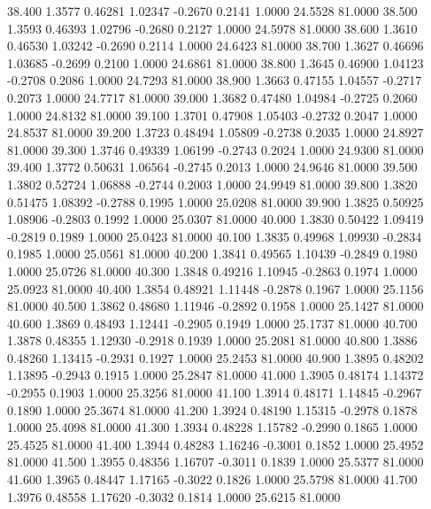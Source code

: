   38.400   1.3577   0.46281   1.02347  -0.2670   0.2141   1.0000  24.5528  81.0000
  38.500   1.3593   0.46393   1.02796  -0.2680   0.2127   1.0000  24.5978  81.0000
  38.600   1.3610   0.46530   1.03242  -0.2690   0.2114   1.0000  24.6423  81.0000
  38.700   1.3627   0.46696   1.03685  -0.2699   0.2100   1.0000  24.6861  81.0000
  38.800   1.3645   0.46900   1.04123  -0.2708   0.2086   1.0000  24.7293  81.0000
  38.900   1.3663   0.47155   1.04557  -0.2717   0.2073   1.0000  24.7717  81.0000
  39.000   1.3682   0.47480   1.04984  -0.2725   0.2060   1.0000  24.8132  81.0000
  39.100   1.3701   0.47908   1.05403  -0.2732   0.2047   1.0000  24.8537  81.0000
  39.200   1.3723   0.48494   1.05809  -0.2738   0.2035   1.0000  24.8927  81.0000
  39.300   1.3746   0.49339   1.06199  -0.2743   0.2024   1.0000  24.9300  81.0000
  39.400   1.3772   0.50631   1.06564  -0.2745   0.2013   1.0000  24.9646  81.0000
  39.500   1.3802   0.52724   1.06888  -0.2744   0.2003   1.0000  24.9949  81.0000
  39.800   1.3820   0.51475   1.08392  -0.2788   0.1995   1.0000  25.0208  81.0000
  39.900   1.3825   0.50925   1.08906  -0.2803   0.1992   1.0000  25.0307  81.0000
  40.000   1.3830   0.50422   1.09419  -0.2819   0.1989   1.0000  25.0423  81.0000
  40.100   1.3835   0.49968   1.09930  -0.2834   0.1985   1.0000  25.0561  81.0000
  40.200   1.3841   0.49565   1.10439  -0.2849   0.1980   1.0000  25.0726  81.0000
  40.300   1.3848   0.49216   1.10945  -0.2863   0.1974   1.0000  25.0923  81.0000
  40.400   1.3854   0.48921   1.11448  -0.2878   0.1967   1.0000  25.1156  81.0000
  40.500   1.3862   0.48680   1.11946  -0.2892   0.1958   1.0000  25.1427  81.0000
  40.600   1.3869   0.48493   1.12441  -0.2905   0.1949   1.0000  25.1737  81.0000
  40.700   1.3878   0.48355   1.12930  -0.2918   0.1939   1.0000  25.2081  81.0000
  40.800   1.3886   0.48260   1.13415  -0.2931   0.1927   1.0000  25.2453  81.0000
  40.900   1.3895   0.48202   1.13895  -0.2943   0.1915   1.0000  25.2847  81.0000
  41.000   1.3905   0.48174   1.14372  -0.2955   0.1903   1.0000  25.3256  81.0000
  41.100   1.3914   0.48171   1.14845  -0.2967   0.1890   1.0000  25.3674  81.0000
  41.200   1.3924   0.48190   1.15315  -0.2978   0.1878   1.0000  25.4098  81.0000
  41.300   1.3934   0.48228   1.15782  -0.2990   0.1865   1.0000  25.4525  81.0000
  41.400   1.3944   0.48283   1.16246  -0.3001   0.1852   1.0000  25.4952  81.0000
  41.500   1.3955   0.48356   1.16707  -0.3011   0.1839   1.0000  25.5377  81.0000
  41.600   1.3965   0.48447   1.17165  -0.3022   0.1826   1.0000  25.5798  81.0000
  41.700   1.3976   0.48558   1.17620  -0.3032   0.1814   1.0000  25.6215  81.0000
